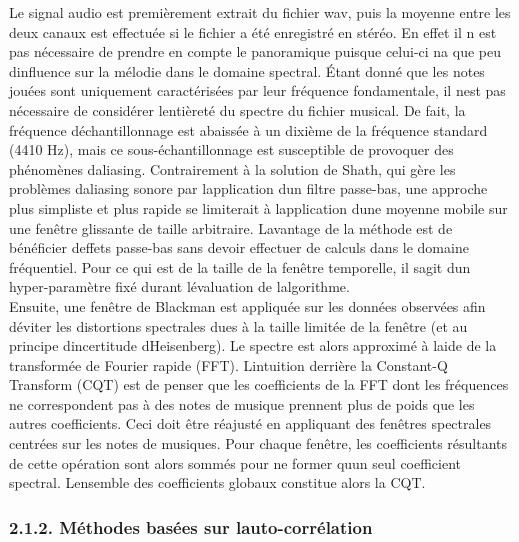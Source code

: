 \documentclass[letterpaper]{article}
\begin{document}
Le signal audio est premièrement extrait du fichier wav, puis la moyenne entre les 
deux canaux est effectuée si le fichier a été enregistré en stéréo. En effet il n\textquotesingle
est pas nécessaire de prendre en compte le panoramique puisque celui-ci n\textquotesingle a que 
peu d\textquotesingle influence sur la mélodie dans le domaine spectral. 
Étant donné que les notes jouées sont uniquement caractérisées par leur fréquence fondamentale,
il n\textquotesingle est pas nécessaire de considérer l\textquotesingle entièreté du spectre
du fichier musical. De fait, la fréquence d\textquotesingle échantillonnage est abaissée à un dixième 
de la fréquence standard (4410 Hz), mais ce sous-échantillonnage est susceptible de provoquer des
phénomènes d\textquotesingle aliasing. Contrairement à la solution de Sh\textquotesingle ath, 
qui gère les problèmes d\textquotesingle aliasing sonore par l\textquotesingle application 
d\textquotesingle un filtre passe-bas, une approche plus simpliste et plus rapide se limiterait à
l\textquotesingle application d\textquotesingle une moyenne mobile sur une fenêtre glissante
de taille arbitraire. L\textquotesingle avantage de la méthode est de bénéficier d\textquotesingle effets
passe-bas sans devoir effectuer de calculs dans le domaine fréquentiel. Pour ce qui est de la taille
de la fenêtre temporelle, il s\textquotesingle agit d\textquotesingle un hyper-paramètre fixé durant
l\textquotesingle évaluation de l\textquotesingle algorithme. \citep{IS}\\

Ensuite, une fenêtre de Blackman est appliquée sur les données observées afin d\textquotesingle éviter les distortions spectrales
dues à la taille limitée de la fenêtre (et au principe d\textquotesingle incertitude d\textquotesingle Heisenberg). Le spectre est alors
approximé à l\textquotesingle aide de la transformée de Fourier rapide (FFT). L\textquotesingle intuition derrière la Constant-Q Transform (CQT)
est de penser que les coefficients de la FFT dont les fréquences ne correspondent pas à des notes de musique prennent plus de poids que les autres
coefficients. Ceci doit être réajusté en appliquant des fenêtres spectrales centrées sur les notes de musiques. Pour chaque fenêtre, les coefficients résultants de cette opération sont alors sommés pour ne former qu\textquotesingle un seul coefficient spectral. L\textquotesingle ensemble des coefficients globaux
constitue alors la CQT.


\subsubsection*{2.1.2. Méthodes basées sur l\textquotesingle auto-corrélation}
\end{document}
